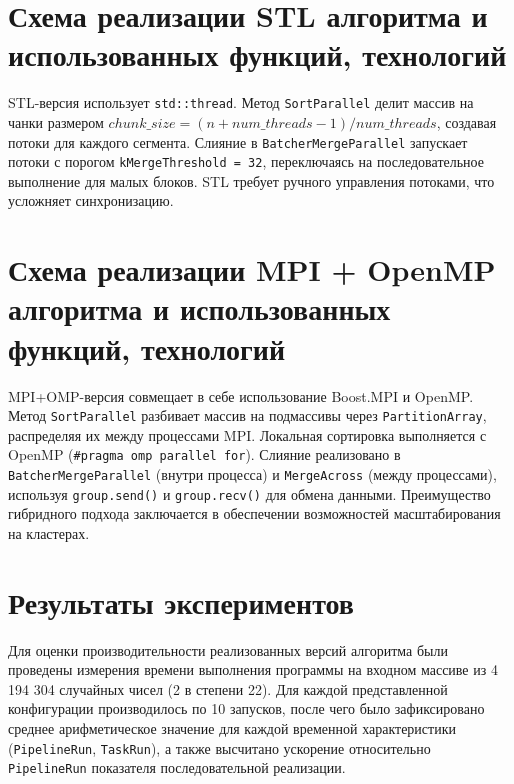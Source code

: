 \documentclass[a4paper,12pt]{article}
\begin{document}
\section*{Схема реализации STL алгоритма и использованных функций, технологий}
STL-версия использует \texttt{std::thread}. Метод \texttt{SortParallel} делит массив на чанки размером \(chunk\_size = (n + num\_threads - 1) / num\_threads\), создавая потоки для каждого сегмента. Слияние в \texttt{BatcherMergeParallel} запускает потоки с порогом \texttt{kMergeThreshold = 32}, переключаясь на последовательное выполнение для малых блоков. STL требует ручного управления потоками, что усложняет синхронизацию.

\section*{Схема реализации MPI + OpenMP алгоритма и использованных функций, технологий}
MPI+OMP-версия совмещает в себе использование Boost.MPI и OpenMP. Метод \texttt{SortParallel} разбивает массив на подмассивы через \texttt{PartitionArray}, распределяя их между процессами MPI. Локальная сортировка выполняется с OpenMP (\texttt{\#pragma omp parallel for}). Слияние реализовано в \texttt{BatcherMergeParallel} (внутри процесса) и \texttt{MergeAcross} (между процессами), используя \texttt{group.send()} и \texttt{group.recv()} для обмена данными. Преимущество гибридного подхода заключается в обеспечении возможностей масштабирования на кластерах.

\section*{Результаты экспериментов}
Для оценки производительности реализованных версий алгоритма были проведены измерения времени выполнения программы на входном массиве из 4 194 304 случайных чисел (2 в степени 22). 
Для каждой представленной конфигурации производилось по 10 запусков, после чего было зафиксировано среднее арифметическое значение для каждой временной характеристики (\texttt{PipelineRun}, \texttt{TaskRun}), а также высчитано ускорение относительно \texttt{PipelineRun} показателя последовательной реализации.
\end{document}
